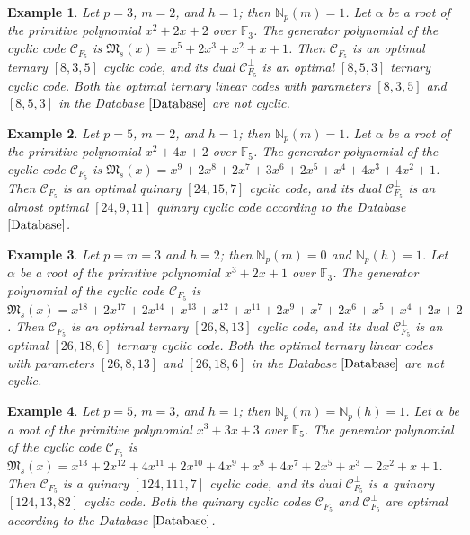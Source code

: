 \documentclass[pdflatex,sn-mathphys-num]{sn-jnl}%
\theoremstyle{thmstyleone}%
\theoremstyle{thmstyletwo}%
\newtheorem{example}{Example}%
\theoremstyle{thmstylethree}%
\begin{document}
\begin{example}
    Let $p=3$, $m=2$, and $h=1$; then $\mathbb{N}_{p}(m)=1$. Let $\alpha$ be a root of the primitive polynomial $x^2 + 2x + 2$ over $\mathbb{F}_{3}$. The generator polynomial of the cyclic code $\mathcal{C}_{F_{5}}$ is $\mathfrak{M}_{s}(x)=x^5 + 2x^3 + x^2 + x + 1$. Then $\mathcal{C}_{F_{5}}$ is an optimal ternary $[8, 3, 5]$ cyclic code, and its dual $\mathcal{C}_{F_{5}}^{\perp}$ is an optimal $[8, 5, 3]$ ternary cyclic code. Both the optimal ternary linear codes with parameters $[8, 3, 5]$ and $[8, 5, 3]$ in the Database $\textnormal{\cite{Database}}$ are not cyclic.
\end{example}
\vspace{1em}
\begin{example}
  Let $p=5$, $m=2$, and $h=1$; then $\mathbb{N}_{p}(m)=1$. Let $\alpha$ be a root of the primitive polynomial $x^2 + 4x + 2$ over $\mathbb{F}_{5}$. The generator polynomial of the cyclic code $\mathcal{C}_{F_{5}}$ is $\mathfrak{M}_{s}(x)=x^9 + 2x^8 + 2x^7 + 3x^6 + 2x^5 + x^4 + 4x^3 + 4x^2 + 1$. Then $\mathcal{C}_{F_{5}}$ is an optimal quinary $[24, 15, 7]$ cyclic code, and its dual $\mathcal{C}_{F_{5}}^{\perp}$ is an almost optimal $[24, 9, 11]$ quinary cyclic code according to the Database $\textnormal{\cite{Database}}$. %
\end{example}
\vspace{1em}
\begin{example}
    Let $p=m=3$ and $h=2$; then $\mathbb{N}_{p}(m)=0$ and $\mathbb{N}_{p}(h)=1$. Let $\alpha$ be a root of the primitive polynomial $x^3 + 2x + 1$ over $\mathbb{F}_{3}$. The generator polynomial of the cyclic code $\mathcal{C}_{F_{5}}$ is $\mathfrak{M}_{s}(x)=x^{18} + 2x^{17} +  2x^{14} + x^{13} + x^{12} + x^{11} + 2x^9 + x^7 + 2x^6 + x^5 + x^4 + 2x + 2$. Then $\mathcal{C}_{F_{5}}$ is an optimal ternary $[26, 8, 13]$ cyclic code, and its dual $\mathcal{C}_{F_{5}}^{\perp}$ is an optimal $[26, 18, 6]$ ternary cyclic code. Both the optimal ternary linear codes with parameters $[26, 8, 13]$ and $[26, 18, 6]$ in the Database $\textnormal{\cite{Database}}$ are not cyclic.
\end{example}
\vspace{1em}
\begin{example}
    Let $p=5$, $m=3$, and $h=1$; then $\mathbb{N}_{p}(m)=\mathbb{N}_{p}(h)=1$. Let $\alpha$ be a root of the primitive polynomial $x^3 + 3x + 3$ over $\mathbb{F}_{5}$. The generator polynomial of the cyclic code $\mathcal{C}_{F_{5}}$ is $\mathfrak{M}_{s}(x)=x^{13} + 2x^{12} +  4x^{11} + 2x^{10} + 4x^9 + x^8 + 4x^7 + 2x^5 + x^3 + 2x^2 + x + 1$. Then $\mathcal{C}_{F_{5}}$ is a quinary $[124, 111, 7]$ cyclic code, and its dual $\mathcal{C}_{F_{5}}^{\perp}$ is a quinary $[124, 13, 82]$ cyclic code. Both the quinary cyclic codes $\mathcal{C}_{F_{5}}$ and $\mathcal{C}_{F_{5}}^{\perp}$ are optimal according to the Database $\textnormal{\cite{Database}}$.
\end{example}
\end{document}
